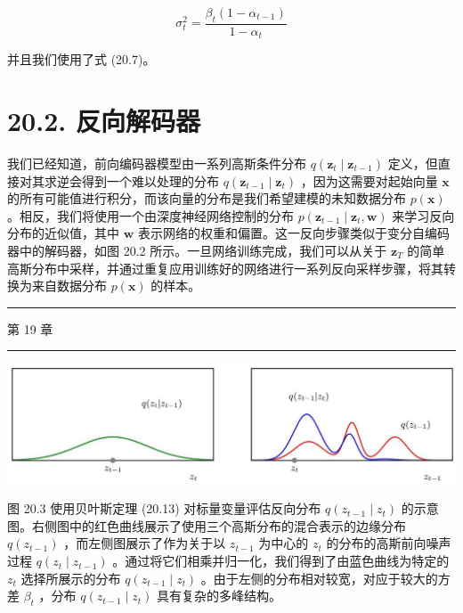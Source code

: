 \documentclass[10pt]{report}
\newcommand{\HRule}{\begin{center}\rule{0.9\linewidth}{0.2mm}\end{center}}
\begin{document}
\[
{\sigma }_{t}^{2} = \frac{{\beta }_{t}\left( {1 - {\alpha }_{t - 1}}\right) }{1 - {\alpha }_{t}} \tag{20.17}
\]

并且我们使用了式 (20.7)。

\section*{20.2. 反向解码器}

我们已经知道，前向编码器模型由一系列高斯条件分布 \(q\left( {{\mathbf{z}}_{t} \mid  {\mathbf{z}}_{t - 1}}\right)\) 定义，但直接对其求逆会得到一个难以处理的分布 \(q\left( {{\mathbf{z}}_{t - 1} \mid  {\mathbf{z}}_{t}}\right)\) ，因为这需要对起始向量 \(\mathbf{x}\) 的所有可能值进行积分，而该向量的分布是我们希望建模的未知数据分布 \(p\left( \mathbf{x}\right)\) 。相反，我们将使用一个由深度神经网络控制的分布 \(p\left( {{\mathbf{z}}_{t - 1} \mid  {\mathbf{z}}_{t},\mathbf{w}}\right)\) 来学习反向分布的近似值，其中 \(\mathbf{w}\) 表示网络的权重和偏置。这一反向步骤类似于变分自编码器中的解码器，如图 20.2 所示。一旦网络训练完成，我们可以从关于 \({\mathbf{z}}_{T}\) 的简单高斯分布中采样，并通过重复应用训练好的网络进行一系列反向采样步骤，将其转换为来自数据分布 \(p\left( \mathbf{x}\right)\) 的样本。

\HRule

第 19 章

\HRule

\begin{center}
\includegraphics[max width=1.0\textwidth]{images/0194e279-9b28-703a-88f4-c3ac21e2010d_605_243_345_1305_349_0.jpg}
\end{center}
\hspace*{3em} 

图 20.3 使用贝叶斯定理 (20.13) 对标量变量评估反向分布 \(q\left( {{z}_{t - 1} \mid  {z}_{t}}\right)\) 的示意图。右侧图中的红色曲线展示了使用三个高斯分布的混合表示的边缘分布 \(q\left( {z}_{t - 1}\right)\) ，而左侧图展示了作为关于以 \({z}_{t - 1}\) 为中心的 \({z}_{t}\) 的分布的高斯前向噪声过程 \(q\left( {{z}_{t} \mid  {z}_{t - 1}}\right)\) 。通过将它们相乘并归一化，我们得到了由蓝色曲线为特定的 \({z}_{t}\) 选择所展示的分布 \(q\left( {{z}_{t - 1} \mid  {z}_{t}}\right)\) 。由于左侧的分布相对较宽，对应于较大的方差 \({\beta }_{t}\) ，分布 \(q\left( {{z}_{t - 1} \mid  {z}_{t}}\right)\) 具有复杂的多峰结构。
\end{document}
